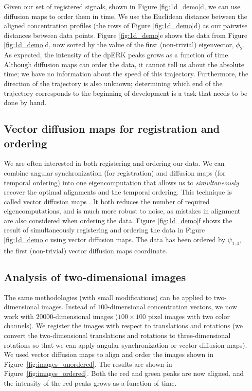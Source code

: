 \documentclass{pnastwo}
\begin{document}
\begin{article}
Given our set of registered signals, shown in Figure \ref{fig:1d_demo}d, we can use diffusion maps to order them in time.
%
We use the Euclidean distance between the aligned concentration profiles (the rows of Figure \ref{fig:1d_demo}d) as our pairwise distances between data points.
%
Figure \ref{fig:1d_demo}e shows the data from Figure \ref{fig:1d_demo}d, now sorted by the value of the first (non-trivial) eigenvector, $\phi_2$. 
%
As expected, the intensity of the dpERK peaks grows as a function of time. 
%
Although diffusion maps can order the data, it cannot tell us about the absolute time; we have no information about the speed of this trajectory.
%
Furthermore, the direction of the trajectory is also unknown; determining which end of the trajectory corresponds to the beginning of development is a task that needs to be done by hand.

\subsection{Vector diffusion maps for registration and ordering}

We are often interested in both registering and ordering our data.
%
%
We can combine angular synchronization (for registration) and diffusion maps (for temporal ordering) into one eigencomputation that allows us to {\em simultaneously} recover the optimal alignments and the temporal ordering.
%
This technique is called vector diffusion maps \cite{singer2012vector}.
%
It both reduces the number of required eigencomputations, and is much more robust to noise, as mistakes in alignment are also considered when ordering the data.
%
Figure \ref{fig:1d_demo}f shows the result of simultaneously registering and ordering the data in Figure \ref{fig:1d_demo}c using vector diffusion maps. 
%
The data has been ordered by $\psi_{1, 3}$, the first (non-trivial) vector diffusion maps coordinate. 

\subsection{Analysis of two-dimensional images}

The same methodologies (with small modifications) can be applied to two-dimensional images.
%
Instead of $100$-dimensional concentration vectors, we now work with $20000$-dimensional images ($100 \times 100$ pixel images with two color channels).
%
We register the images with respect to translations and rotations 
(we convert the two-dimensional translations and rotations to three-dimensional rotations so that we can apply angular synchronization or vector diffusion maps). 
%
We used vector diffusion maps to align and order the images shown in Figure~\ref{fig:images_unordered}.
%
The results are shown in Figure~\ref{fig:images_ordered}.
%
Both the red and green peaks are now aligned, and the intensity of the red peaks grows as a function of time.


\end{article}
\end{document}

